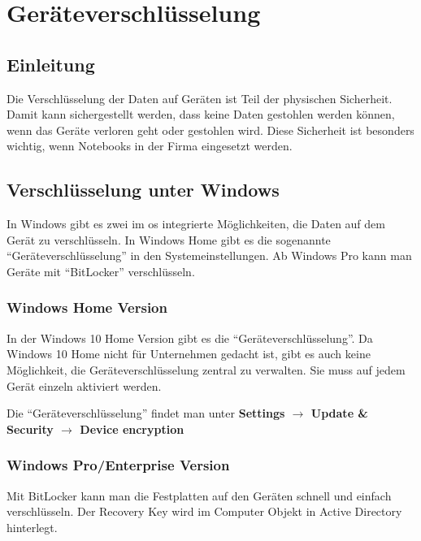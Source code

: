 \chapter{Geräteverschlüsselung}
\section{Einleitung}
Die Verschlüsselung der Daten auf Geräten ist Teil der physischen Sicherheit.
Damit kann sichergestellt werden, dass keine Daten gestohlen werden können, wenn das Geräte verloren geht oder gestohlen wird.
Diese Sicherheit ist besonders wichtig, wenn Notebooks in der Firma eingesetzt werden.

\section{Verschlüsselung unter Windows}
In Windows gibt es zwei im \acrshort{os} integrierte Möglichkeiten, die Daten auf dem Gerät zu verschlüsseln.
In Windows Home gibt es die sogenannte ``Geräteverschlüsselung'' in den Systemeinstellungen.
Ab Windows Pro kann man Geräte mit ``BitLocker'' verschlüsseln.\\

\subsection{Windows Home Version}
In der Windows 10 Home Version gibt es die ``Geräteverschlüsselung''.
Da Windows 10 Home nicht für Unternehmen gedacht ist, gibt es auch keine Möglichkeit, die Geräteverschlüsselung zentral zu verwalten.
Sie muss auf jedem Gerät einzeln aktiviert werden.

Die ``Geräteverschlüsselung'' findet man unter \textbf{Settings $\rightarrow$ Update \& Security $\rightarrow$ Device encryption}

\subsection{Windows Pro/Enterprise Version}
Mit BitLocker kann man die Festplatten auf den Geräten schnell und einfach verschlüsseln.
Der Recovery Key wird im Computer Objekt in Active Directory hinterlegt.

